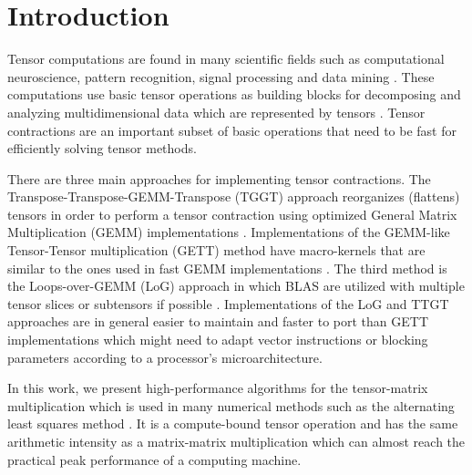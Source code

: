 \section{Introduction}
\label{sec:introduction}
Tensor computations are found in many scientific fields such as computational neuroscience, pattern recognition, signal processing and data mining \cite{karahan:2015:tensor, papalexakis:2017:tensors}.
These computations use basic tensor operations as building blocks for decomposing and analyzing multidimensional data which are represented by tensors \cite{lee:2018:fundamental, kolda:2009:decompositions}. 
Tensor contractions are an important subset of basic operations that need to be fast for efficiently solving tensor methods.

There are three main approaches for implementing tensor contractions.
The Transpose-Transpose-GEMM-Transpose (TGGT) approach reorganizes (flattens) tensors in order to perform a tensor contraction using optimized General Matrix Multiplication (GEMM) implementations \cite{bader:2006:algorithm862, solomonik:2013:cyclops}.
Implementations of the GEMM-like Tensor-Tensor multiplication (GETT) method have macro-kernels that are similar to the ones used in fast GEMM implementations \cite{springer:2018:design, matthews:2018:high}.
The third method is the Loops-over-GEMM (LoG) approach in which BLAS are utilized with multiple tensor slices or subtensors if possible \cite{dinapoli:2014:towards.efficient.use, li:2015:input, shi:2016:tensor.contraction, bassoy:2019:ttv}.
Implementations of the LoG and TTGT approaches are in general easier to maintain and faster to port than GETT implementations which might need to adapt vector instructions or blocking parameters according to a processor's microarchitecture.


In this work, we present high-performance algorithms for the tensor-matrix multiplication which is used in many numerical methods such as the alternating least squares method \cite{lee:2018:fundamental, kolda:2009:decompositions}.
It is a compute-bound tensor operation and has the same arithmetic intensity as a matrix-matrix multiplication which can almost reach the practical peak performance of a computing machine.

